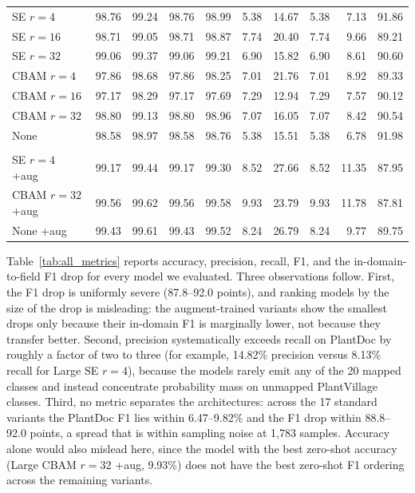 \documentclass[preprint,12pt]{elsarticle}
\begin{document}
\begin{table}[t]
\begin{tabular}{l rrrr rrrrr}
SE $r=4$ & 98.76 & 99.24 & 98.76 & 98.99 & 5.38 & 14.67 & 5.38 & 7.13 & 91.86 \\
SE $r=16$ & 98.71 & 99.05 & 98.71 & 98.87 & 7.74 & 20.40 & 7.74 & 9.66 & 89.21 \\
SE $r=32$ & 99.06 & 99.37 & 99.06 & 99.21 & 6.90 & 15.82 & 6.90 & 8.61 & 90.60 \\
CBAM $r=4$ & 97.86 & 98.68 & 97.86 & 98.25 & 7.01 & 21.76 & 7.01 & 8.92 & 89.33 \\
CBAM $r=16$ & 97.17 & 98.29 & 97.17 & 97.69 & 7.29 & 12.94 & 7.29 & 7.57 & 90.12 \\
CBAM $r=32$ & 98.80 & 99.13 & 98.80 & 98.96 & 7.07 & 16.05 & 7.07 & 8.42 & 90.54 \\
None & 98.58 & 98.97 & 98.58 & 98.76 & 5.38 & 15.51 & 5.38 & 6.78 & 91.98 \\
\addlinespace
\multicolumn{10}{l}{\textit{Adapted (Large, CutMix+MixUp)}} \\
SE $r=4$ +aug & 99.17 & 99.44 & 99.17 & 99.30 & 8.52 & 27.66 & 8.52 & 11.35 & 87.95 \\
CBAM $r=32$ +aug & 99.56 & 99.62 & 99.56 & 99.58 & 9.93 & 23.79 & 9.93 & 11.78 & 87.81 \\
None +aug & 99.43 & 99.61 & 99.43 & 99.52 & 8.24 & 26.79 & 8.24 & 9.77 & 89.75 \\
\bottomrule
\end{tabular}
\end{table}

Table~\ref{tab:all_metrics} reports accuracy, precision, recall, F1, and the in-domain-to-field F1 drop for every model we evaluated. Three observations follow. First, the F1 drop is uniformly severe (87.8--92.0 points), and ranking models by the size of the drop is misleading: the augment-trained variants show the smallest drops only because their in-domain F1 is marginally lower, not because they transfer better. Second, precision systematically exceeds recall on PlantDoc by roughly a factor of two to three (for example, 14.82\% precision versus 8.13\% recall for Large SE $r=4$), because the models rarely emit any of the 20 mapped classes and instead concentrate probability mass on unmapped PlantVillage classes. Third, no metric separates the architectures: across the 17 standard variants the PlantDoc F1 lies within 6.47--9.82\% and the F1 drop within 88.8--92.0 points, a spread that is within sampling noise at 1,783 samples. Accuracy alone would also mislead here, since the model with the best zero-shot accuracy (Large CBAM $r=32$ +aug, 9.93\%) does not have the best zero-shot F1 ordering across the remaining variants.
\end{document}
